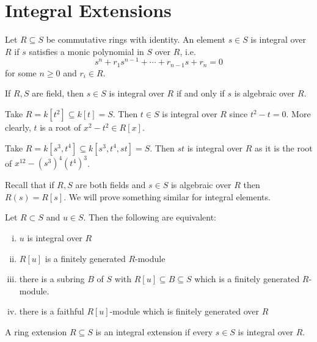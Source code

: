 
\newpage
\section{Integral Extensions}

\begin{dfn}[Integral]
Let $R \subseteq S$ be commutative rings with identity. An element $s \in S$ is integral over $R$ if $s$ satisfies a monic polynomial in $S$ over $R$, i.e.
\[
s^n+r_1s^{n-1}+\cdots+r_{n-1}s+r_n=0
\]
for some $n \geq 0$ and $r_i \in R$. 
\end{dfn}

\begin{ex}
If $R,S$ are field, then $s \in S$ is integral over $R$ if and only if $s$ is algebraic over $R$.
\end{ex}

\begin{ex}
Take $R=k[t^2] \subseteq k[t]=S$. Then $t \in S$ is integral over $R$ since $t^2-t=0$. More clearly, $t$ is a root of $x^2-t^2 \in R[x]$. 
\end{ex}

\begin{ex}
Take $R=k[s^3,t^4] \subseteq k[s^3,t^4,st]=S$. Then $st$ is integral over $R$ as it is the root of $x^{12}-(s^3)^4(t^4)^3$. 
\end{ex}

\begin{rem}
Recall that if $R,S$ are both fields and $s \in S$ is algebraic over $R$ then $R(s)=R[s]$. We will prove something similar for integral elements. 
\end{rem}

\begin{prop}
Let $R \subset S$ and $u \in S$. Then the following are equivalent:
\begin{enumerate}[(i)]
\item $u$ is integral over $R$
\item $R[u]$ is a finitely generated $R$-module
\item there is a subring $B$ of $S$ with $R[u]\subseteq B \subseteq S$ which is a finitely generated $R$-module.
\item there is a faithful $R[u]$-module which is finitely generated over $R$
\end{enumerate}
\end{prop}

\begin{dfn}
A ring extension $R \subseteq S$ is an integral extension if every $s \in S$ is integral over $R$.
\end{dfn}

